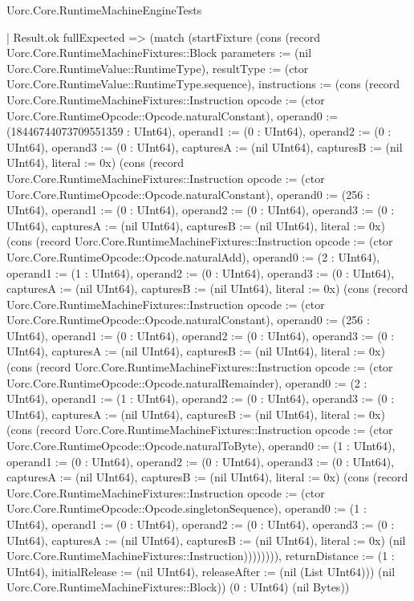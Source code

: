 \begin{lexlean}{Uorc.Core.RuntimeMachineEngineTests}
\begin{semanticmodule}
{        | Result.ok fullExpected => (match (startFixture (cons (record Uorc.Core.RuntimeMachineFixtures::Block {parameters := (nil Uorc.Core.RuntimeValue::RuntimeType), resultType := (ctor Uorc.Core.RuntimeValue::RuntimeType.sequence), instructions := (cons (record Uorc.Core.RuntimeMachineFixtures::Instruction {opcode := (ctor Uorc.Core.RuntimeOpcode::Opcode.naturalConstant), operand0 := (18446744073709551359 : UInt64), operand1 := (0 : UInt64), operand2 := (0 : UInt64), operand3 := (0 : UInt64), capturesA := (nil UInt64), capturesB := (nil UInt64), literal := 0x}) (cons (record Uorc.Core.RuntimeMachineFixtures::Instruction {opcode := (ctor Uorc.Core.RuntimeOpcode::Opcode.naturalConstant), operand0 := (256 : UInt64), operand1 := (0 : UInt64), operand2 := (0 : UInt64), operand3 := (0 : UInt64), capturesA := (nil UInt64), capturesB := (nil UInt64), literal := 0x}) (cons (record Uorc.Core.RuntimeMachineFixtures::Instruction {opcode := (ctor Uorc.Core.RuntimeOpcode::Opcode.naturalAdd), operand0 := (2 : UInt64), operand1 := (1 : UInt64), operand2 := (0 : UInt64), operand3 := (0 : UInt64), capturesA := (nil UInt64), capturesB := (nil UInt64), literal := 0x}) (cons (record Uorc.Core.RuntimeMachineFixtures::Instruction {opcode := (ctor Uorc.Core.RuntimeOpcode::Opcode.naturalConstant), operand0 := (256 : UInt64), operand1 := (0 : UInt64), operand2 := (0 : UInt64), operand3 := (0 : UInt64), capturesA := (nil UInt64), capturesB := (nil UInt64), literal := 0x}) (cons (record Uorc.Core.RuntimeMachineFixtures::Instruction {opcode := (ctor Uorc.Core.RuntimeOpcode::Opcode.naturalRemainder), operand0 := (2 : UInt64), operand1 := (1 : UInt64), operand2 := (0 : UInt64), operand3 := (0 : UInt64), capturesA := (nil UInt64), capturesB := (nil UInt64), literal := 0x}) (cons (record Uorc.Core.RuntimeMachineFixtures::Instruction {opcode := (ctor Uorc.Core.RuntimeOpcode::Opcode.naturalToByte), operand0 := (1 : UInt64), operand1 := (0 : UInt64), operand2 := (0 : UInt64), operand3 := (0 : UInt64), capturesA := (nil UInt64), capturesB := (nil UInt64), literal := 0x}) (cons (record Uorc.Core.RuntimeMachineFixtures::Instruction {opcode := (ctor Uorc.Core.RuntimeOpcode::Opcode.singletonSequence), operand0 := (1 : UInt64), operand1 := (0 : UInt64), operand2 := (0 : UInt64), operand3 := (0 : UInt64), capturesA := (nil UInt64), capturesB := (nil UInt64), literal := 0x}) (nil Uorc.Core.RuntimeMachineFixtures::Instruction)))))))), returnDistance := (1 : UInt64), initialRelease := (nil UInt64), releaseAfter := (nil (List UInt64))}) (nil Uorc.Core.RuntimeMachineFixtures::Block)) (0 : UInt64) (nil Bytes))
}
\end{semanticmodule}
\end{lexlean}
